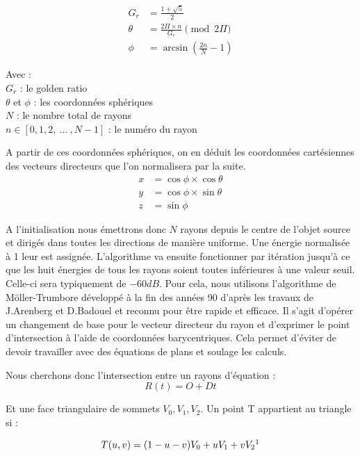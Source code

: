 \begin{align}
G_r &= \frac{1 + \sqrt{5}}{2} \\
\theta &= \frac{2 \Pi \times n}{G_r}  \pmod{2\Pi} \\
\phi &= \arcsin{(\frac{2n}{N}-1)} 
\end{align}

Avec : \\
$G_r$ : le golden ratio \\
$\theta$ et $\phi$ : les coordonnées sphériques \\
$N$ : le nombre total de rayons \\
$n \in[0, 1, 2, \ ... \ ,N-1]$ : le numéro du rayon 

A partir de ces coordonnées sphériques, on en déduit les coordonnées cartésiennes des vecteurs directeurs que l'on normalisera par la suite.
\begin{align}
x &= \cos{\phi} \times \cos{\theta} \\
y &= \cos{\phi} \times \sin{\theta} \\
z &= \sin{\phi}
\end{align}


A l'initialisation nous émettrons donc $N$ rayons depuis le centre de l'objet source et dirigés dans toutes les directions de manière uniforme. Une énergie normalisée à 1 leur est assignée. L'algorithme va ensuite fonctionner par itération jusqu'à ce que les huit énergies de tous les rayons soient toutes inférieures à une valeur seuil. Celle-ci sera typiquement de $-60dB$.  Pour cela, nous utilisons l'algorithme de Möller-Trumbore \cite[p. 2-3]{moller} développé à la fin des années 90 d'après les travaux de J.Arenberg \cite{arenberg} et D.Badouel \cite[p. 390-393]{badouel} et reconnu pour être rapide et efficace. Il s'agit d'opérer un changement de base pour le vecteur directeur du rayon et d'exprimer le point d'intersection à l'aide de coordonnées barycentriques. Cela permet d'éviter de devoir travailler avec des équations de plans et soulage les calculs.

Nous cherchons donc l'intersection entre un rayons d'équation : 
\begin{equation}
R(t) = O + Dt
\end{equation}

Et une face triangulaire de sommets $ V_0, V_1, V_2$. Un point T appartient au triangle si : 

\begin{equation} \label{eq_2moller}
T(u,v) = (1-u-v)V_0 + uV_1 + vV_2 \footnotemark
\end{equation}

